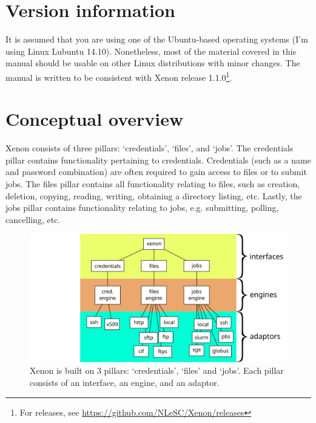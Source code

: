 \documentclass[12pt, a4paper, twoside, openany, titlepage]{book}
\begin{document}
\section{Version information}

It is assumed that you are using one of the Ubuntu-based operating systems (I'm using Linux Lubuntu 14.10). Nonetheless, most of the material covered in this manual should be usable on other Linux distributions with minor changes. The manual is written to be consistent with Xenon release 1.1.0\footnote{For releases, see \url{https://github.com/NLeSC/Xenon/releases}}.


\section{Conceptual overview}





Xenon consists of three pillars: `credentials', `files', and `jobs'.
%
The credentials pillar contains functionality pertaining to credentials. Credentials (such as a name and password combination) are often required to gain access to files or to submit jobs.
%
The files pillar contains all functionality relating to files, such as creation, deletion, copying, reading, writing, obtaining a directory listing, etc.
%
Lastly, the jobs pillar contains functionality relating to jobs, e.g. submitting, polling, cancelling, etc.


\begin{figure}[ht]
\centering
\includegraphics[width=1.0\columnwidth]{images/xenon-design}
\caption{\label{fig:xenon-design} Xenon is built on 3 pillars: `credentials', `files' and `jobs'. Each pillar consists of an interface, an engine, and an adaptor.}
\end{figure}
\end{document}

